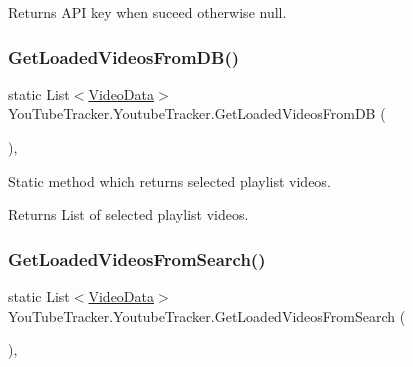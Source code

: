 \begin{DoxyReturn}{Returns}
A\+PI key when suceed otherwise {\ttfamily null}.
\end{DoxyReturn}
\mbox{\label{class_you_tube_tracker_1_1_youtube_tracker_a6a194051a9ab5add4c090da7392a8c9d}} 
\subsubsection{\texorpdfstring{Get\+Loaded\+Videos\+From\+D\+B()}{GetLoadedVideosFromDB()}}
{\footnotesize\ttfamily static List$<$\mbox{\hyperlink{struct_you_tube_tracker_1_1_video_data}{Video\+Data}}$>$ You\+Tube\+Tracker.\+Youtube\+Tracker.\+Get\+Loaded\+Videos\+From\+DB (\begin{DoxyParamCaption}{ }\end{DoxyParamCaption})\hspace{0.3cm}{\ttfamily [inline]}, {\ttfamily [static]}}



Static method which returns selected playlist videos. 

\begin{DoxyReturn}{Returns}
List of selected playlist videos.
\end{DoxyReturn}
\mbox{\label{class_you_tube_tracker_1_1_youtube_tracker_a051294db3492eddceab4772c431cc5bc}} 
\subsubsection{\texorpdfstring{Get\+Loaded\+Videos\+From\+Search()}{GetLoadedVideosFromSearch()}}
{\footnotesize\ttfamily static List$<$\mbox{\hyperlink{struct_you_tube_tracker_1_1_video_data}{Video\+Data}}$>$ You\+Tube\+Tracker.\+Youtube\+Tracker.\+Get\+Loaded\+Videos\+From\+Search (\begin{DoxyParamCaption}{ }\end{DoxyParamCaption})\hspace{0.3cm}{\ttfamily [inline]}, {\ttfamily [static]}}




